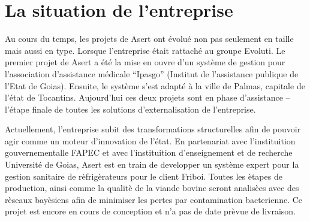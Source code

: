 

\section{La situation de l'entreprise}

Au cours du temps, les projets de Asert ont évolué non pas seulement en taille mais aussi en type. Lorsque l'entreprise était rattaché au groupe Evoluti. Le premier projet de Asert a été la mise en ouvre d'un système de gestion pour l'association d'assistance médicale ``Ipasgo'' (Institut de l'assistance publique de l'Etat de Goias). Ensuite, le système s'est adapté à la ville de Palmas, capitale de l'état de Tocantins. Aujourd'hui ces deux projets sont en phase d'assistance -- l'étape finale de toutes les solutions d'externalisation de l'entreprise.

Actuellement, l'entreprise subit des transformations structurelles afin de pouvoir agir comme un moteur d'innovation de l'état. En partenariat avec l'instituition gouvernementalle FAPEC et avec l'instituition d'enseignement et de recherche Université de Goias, Asert est en train de developper un système expert pour la gestion sanitaire de rèfrigèrateurs pour le client Friboi. Toutes les ètapes de production, ainsi comme la qualitè de la viande bovine seront analisèes avec des rèseaux bayèsiens afin de minimiser les pertes par contamination bacterienne. Ce projet est encore en cours de conception et n'a pas de date prèvue de livraison.





